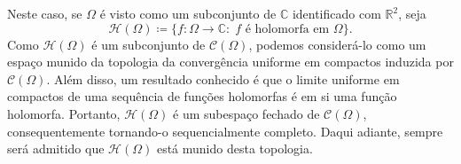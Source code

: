 \documentclass[../distribution_theory_notes.tex]{subfiles}
\begin{document}
\begin{example}
	Neste caso, se \(\Omega \) é visto como um subconjunto de \(\mathbb{C}\) identificado com \(\mathbb{R}^{2}\), seja
	\[
		\mathcal{H}(\Omega )\coloneqq \{f:\Omega \rightarrow \mathbb{C}:\; f \text{ é holomorfa em }\Omega \}.
	\]
	Como \(\mathcal{H}(\Omega )\) é um subconjunto de \(\mathcal{C}(\Omega )\), podemos considerá-lo como um espaço munido da topologia da convergência uniforme em compactos induzida por \(\mathcal{C}(\Omega )\). Além disso, um resultado conhecido é que o limite uniforme em compactos de uma sequência de funções holomorfas é em si uma função holomorfa. Portanto, \(\mathcal{H}(\Omega )\) é um subespaço fechado de \(\mathcal{C}(\Omega )\), consequentemente tornando-o sequencialmente completo. Daqui adiante, sempre será admitido que \(\mathcal{H}(\Omega )\) está munido desta topologia.
\end{example}
\end{document}
